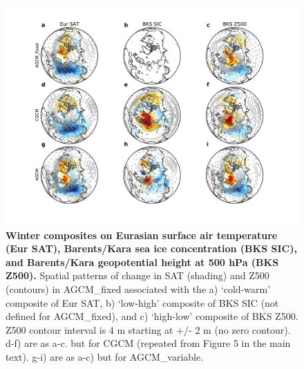 \documentclass{nature}
\begin{document}
\begin{figure}%
\centering
\noindent\includegraphics[width=39pc]{Word/SuppFig_xx.pdf}
\caption{\textbf{Winter composites on Eurasian surface air temperature (Eur SAT), Barents/Kara sea ice concentration (BKS SIC), and Barents/Kara geopotential height at 500 hPa (BKS Z500).}  Spatial patterns of change in SAT (shading) and Z500 (contours) in AGCM\_fixed associated with the a) `cold-warm' composite of Eur SAT, b) `low-high' composite of BKS SIC (not defined for AGCM\_fixed), and c) `high-low' composite of BKS Z500. Z500 contour interval is 4 m starting at +/- 2 m (no zero contour). d-f) are as a-c. but for CGCM (repeated from Figure 5 in the main text). g-i) are as a-c) but for AGCM\_variable. 
} 
\label{fig:suppxx} 
\end{figure}

\end{document}

